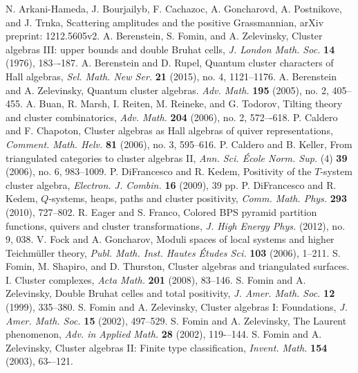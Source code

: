 \documentclass{amsart}
\theoremstyle{definition}
\theoremstyle{remark}
\numberwithin{equation}{section}
\begin{document}
\begin{thebibliography}{99}
   N. Arkani-Hameda, J. Bourjailyb, F. Cachazoc, A. Goncharovd, A. Postnikove, and J. Trnka, Scattering amplitudes and the positive Grassmannian, arXiv preprint: 1212.5605v2.
   A. Berenstein, S. Fomin, and A. Zelevinsky, Cluster algebras III: upper bounds and double Bruhat cells, \textsl{J. London Math. Soc.} \textbf{14} (1976), 183–-187.
   A. Berenstein and D. Rupel, Quantum cluster characters of Hall algebras, \textsl{Sel. Math. New Ser.} \textbf{21} (2015), no. 4, 1121--1176.
   A. Berenstein and A. Zelevinsky, Quantum cluster algebras. \textsl{Adv. Math.} \textbf{195} (2005), no. 2, 405--455.
	 A. Buan, R. Marsh, I. Reiten, M. Reineke, and G. Todorov, Tilting theory and cluster combinatorics, \textsl{Adv. Math.} \textbf{204} (2006), no. 2, 572–-618.
   P. Caldero and F. Chapoton, Cluster algebras as Hall algebras of quiver representations, \textsl{Comment. Math. Helv.} \textbf{81} (2006), no. 3, 595--616.
   P. Caldero and B. Keller, From triangulated categories to cluster algebras II, \textsl{Ann. Sci. \'Ecole Norm. Sup.} (4) \textbf{39} (2006), no. 6, 983--1009.
	 P. DiFrancesco and R. Kedem, Positivity of the $T$-system cluster algebra, \textsl{Electron. J. Combin.} \textbf{16} (2009), 39 pp.
	 P. DiFrancesco and R. Kedem, $Q$-systems, heaps, paths and cluster positivity, \textsl{Comm. Math. Phys.} \textbf{293} (2010), 727--802.
   R. Eager and S. Franco, Colored BPS pyramid partition functions, quivers and cluster transformations, \textsl{J. High Energy Phys.} (2012), no. 9, 038.
	 V. Fock and A. Goncharov, Moduli spaces of local systems and higher Teichm\"uller theory, \textsl{Publ. Math. Inst. Hautes \'Etudes Sci.} \textbf{103} (2006), 1--211.
	 S. Fomin, M. Shapiro, and D. Thurston, Cluster algebras and triangulated surfaces. I. Cluster complexes, \textsl{Acta Math.} \textbf{201} (2008), 83--146.
	 S. Fomin and A. Zelevinsky, Double Bruhat celles and total positivity, \textsl{J. Amer. Math. Soc.} \textbf{12} (1999), 335--380.
	 S. Fomin and A. Zelevinsky, Cluster algebras I: Foundations, \textsl{J. Amer. Math. Soc.} \textbf{15} (2002), 497--529.
	 S. Fomin and A. Zelevinsky, The Laurent phenomenon, \textsl{Adv. in Applied Math.} \textbf{28} (2002), 119-–144.
   S. Fomin and A. Zelevinsky, Cluster algebras II: Finite type classification, \textsl{Invent. Math.} \textbf{154} (2003), 63-–121.

\end{thebibliography}
\end{document}
